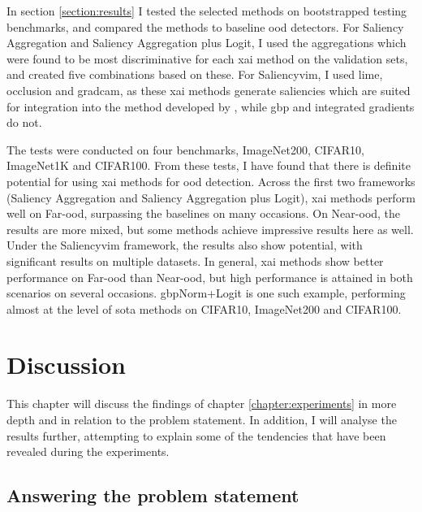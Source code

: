 \documentclass[UKenglish]{uiomasterthesis} %
\theoremstyle{definition}
\begin{document}
In section \ref{section:results} I tested the selected methods on bootstrapped testing benchmarks, and compared the methods to baseline \ac{ood} detectors. For Saliency Aggregation and Saliency Aggregation plus Logit, I used the aggregations which were found to be most discriminative for each \ac{xai} method on the validation sets, and created five combinations based on these. For Saliency\ac{vim}, I used \ac{lime}, occlusion and \ac{gradcam}, as these \ac{xai} methods generate saliencies which are suited for integration into the method developed by \cite{vim}, while \ac{gbp} and integrated gradients do not. 

The tests were conducted on four benchmarks, ImageNet200, CIFAR10, ImageNet1K and  CIFAR100. From these tests, I have found that there is definite potential for using \ac{xai} methods for \ac{ood} detection. Across the first two frameworks (Saliency Aggregation and Saliency Aggregation plus Logit), \ac{xai} methods perform well on Far-\ac{ood}, surpassing the baselines on many occasions. On Near-\ac{ood}, the results are more mixed, but some methods achieve impressive results here as well. Under the Saliency\ac{vim} framework, the results also show potential, with significant results on multiple datasets. In general, \ac{xai} methods show better performance on Far-\ac{ood} than Near-\ac{ood}, but high performance is attained in both scenarios on several occasions. \ac{gbp}Norm+Logit is one such example, performing almost at the level of \ac{sota} methods on CIFAR10, ImageNet200 and CIFAR100.

\chapter{Discussion} \label{chapter:discussion}

This chapter will discuss the findings of chapter \ref{chapter:experiments} in more depth and in relation to the problem statement. In addition, I will analyse the results further, attempting to explain some of the tendencies that have been revealed during the experiments.

\section{Answering the problem statement}
\end{document}
